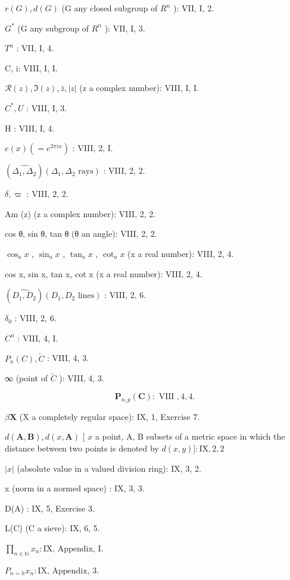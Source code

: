 \(r(G), d(G)\) (G any closed subgroup of \(R^{n}\) ): VII, I, 2.

\(G^{*}\) (G any subgroup of \(R^{n}\) ): VII, I, 3.

\(T^{n}\) : VII, I, 4.

C, i: VIII, I, I.

\(\mathcal{R}(z), \Im(z), \bar{z}, |z|\) (z a complex number): VIII, I, I.

\(C^{*}, U\) : VIII, I, 3.

H : VIII, I, 4.

\(e(x) (= e^{2\pi ix})\) : VIII, 2, I.

\((\widehat{\Delta_{1}, \Delta_{2}})(\Delta_{1}, \Delta_{2}\text{ rays})\) : VIII, 2, 2.

\(\delta, \varpi\) : VIII, 2, 2.

Am (z) (z a complex number): VIII, 2, 2.

cos θ, sin θ, tan θ (θ an angle): VIII, 2, 2.

\(\cos_{a}x\) , \(\sin_{a}x\) , \(\tan_{a}x\) , \(\cot_{a}x\) (x a real number): VIII, 2, 4.

cos x, sin x, tan x, cot x (x a real number): VIII, 2, 4.

\((\widehat{D_{1}, D_{2}})(D_{1}, D_{2}\text{ lines})\) : VIII, 2, 6.

\(\delta_{0}\) : VIII, 2, 6.

\(C^{n}\) : VIII, 4, I.

\(P_{n}(C), \tilde{C}\) : VIII, 4, 3.

∞ (point of \(\tilde{C}\) ): VIII, 4, 3.

\[
\mathbf {P} _ {n, p} (\mathbf {C}): \text { VIII }, 4, 4.
\]

\(\beta \mathbf{X}\) (X a completely regular space): IX, 1, Exercise 7.

\(d(\mathbf{A}, \mathbf{B}), d(x, \mathbf{A})\) {[} \(x\) a point, A, B subsets of a metric space in which the distance between two points is denoted by \(d(x, y)] : \mathrm{IX}, 2, 2\)

\(|x|\) (absolute value in a valued division ring): IX, 3, 2.

\textbar\textbar x\textbar\textbar{} (norm in a normed space) : IX, 3, 3.

D(A) : IX, 5, Exercise 3.

L(C) (C a sieve): IX, 6, 5.

\(\prod_{n \in \mathbb{N}} x_n : \text{IX, Appendix, I.}\)

\(P_{n=h} x_n : \text{IX, Appendix, 3.}\)

